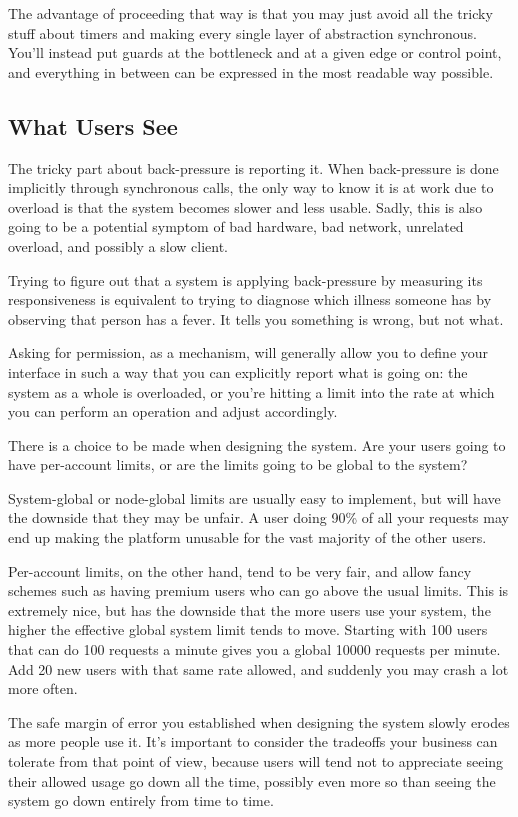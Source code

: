The advantage of proceeding that way is that you may just avoid all the tricky stuff about timers and making every single layer of abstraction synchronous. You'll instead put guards at the bottleneck and at a given edge or control point, and everything in between can be expressed in the most readable way possible.

\subsection{What Users See}

The tricky part about back-pressure is reporting it. When back-pressure is done implicitly through synchronous calls, the only way to know it is at work due to overload is that the system becomes slower and less usable. Sadly, this is also going to be a potential symptom of bad hardware, bad network, unrelated overload, and possibly a slow client.

Trying to figure out that a system is applying back-pressure by measuring its responsiveness is equivalent to trying to diagnose which illness someone has by observing that person has a fever. It tells you something is wrong, but not what.

Asking for permission, as a mechanism, will generally allow you to define your interface in such a way that you can explicitly report what is going on: the system as a whole is overloaded, or you're hitting a limit into the rate at which you can perform an operation and adjust accordingly.

There is a choice to be made when designing the system. Are your users going to have per-account limits, or are the limits going to be global to the system?

System-global or node-global limits are usually easy to implement, but will have the downside that they may be unfair. A user doing 90\% of all your requests may end up making the platform unusable for the vast majority of the other users.

Per-account limits, on the other hand, tend to be very fair, and allow fancy schemes such as having premium users who can go above the usual limits. This is extremely nice, but has the downside that the more users use your system, the higher the effective global system limit tends to move. Starting with 100 users that can do 100 requests a minute gives you a global 10000 requests per minute. Add 20 new users with that same rate allowed, and suddenly you may crash a lot more often.

The safe margin of error you established when designing the system slowly erodes as more people use it. It's important to consider the tradeoffs your business can tolerate from that point of view, because users will tend not to appreciate seeing their allowed usage go down all the time, possibly even more so than seeing the system go down entirely from time to time.


